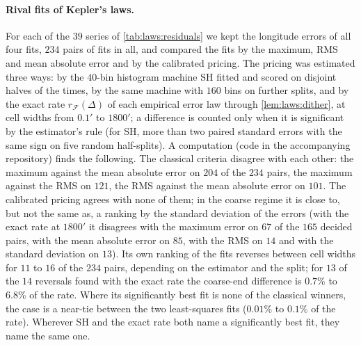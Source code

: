 \paragraph{Rival fits of Kepler's laws.}For each of the $39$ series of \cref{tab:laws:residuals} we kept the longitude errors of all four fits, $234$ pairs of fits in all, and compared the fits by the maximum, RMS and mean absolute error and by the calibrated pricing. The pricing was estimated three ways: by the $40$-bin histogram machine SH fitted and scored on disjoint halves of the times, by the same machine with $160$ bins on further splits, and by the exact rate $r_{\mathcal F}(\Delta)$ of each empirical error law through \cref{lem:laws:dither}, at cell widths from $0.1'$ to $1800'$; a difference is counted only when it is significant by the estimator's rule (for SH, more than two paired standard errors with the same sign on five random half-splits). A computation (code in the accompanying repository) finds the following. The classical criteria disagree with each other: the maximum against the mean absolute error on $204$ of the $234$ pairs, the maximum against the RMS on $121$, the RMS against the mean absolute error on $101$. The calibrated pricing agrees with none of them; in the coarse regime it is close to, but not the same as, a ranking by the standard deviation of the errors (with the exact rate at $1800'$ it disagrees with the maximum error on $67$ of the $165$ decided pairs, with the mean absolute error on $85$, with the RMS on $14$ and with the standard deviation on $13$). Its own ranking of the fits reverses between cell widths for $11$ to $16$ of the $234$ pairs, depending on the estimator and the split; for $13$ of the $14$ reversals found with the exact rate the coarse-end difference is $0.7\%$ to $6.8\%$ of the rate. Where its significantly best fit is none of the classical winners, the case is a near-tie between the two least-squares fits ($0.01\%$ to $0.1\%$ of the rate). Wherever SH and the exact rate both name a significantly best fit, they name the same one.


